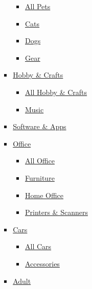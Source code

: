 \begin{itemize}
\begin{itemize}
\begin{itemize}
\begin{itemize}
        \begin{itemize}
        \tightlist
        \item
          \href{/wirecutter/pets/}{All Pets}
        \item
          \href{/wirecutter/pets/cats/}{Cats}
        \item
          \href{/wirecutter/pets/dogs/}{Dogs}
        \item
          \href{/wirecutter/pets/gear-pets/}{Gear}
        \end{itemize}
      \item
        \href{/wirecutter/hobby-crafts/}{Hobby \& Crafts}

        \begin{itemize}
        \tightlist
        \item
          \href{/wirecutter/hobby-crafts/}{All Hobby \& Crafts}
        \item
          \href{/wirecutter/hobby-crafts/music/}{Music}
        \end{itemize}
      \item
        \href{/wirecutter/software/}{Software \& Apps}
      \item
        \href{/wirecutter/office/}{Office}

        \begin{itemize}
        \tightlist
        \item
          \href{/wirecutter/office/}{All Office}
        \item
          \href{/wirecutter/office/furniture-office/}{Furniture}
        \item
          \href{/wirecutter/office/home-office/}{Home Office}
        \item
          \href{/wirecutter/office/printers-scanners/}{Printers \&
          Scanners}
        \end{itemize}
      \item
        \href{/wirecutter/cars/}{Cars}

        \begin{itemize}
        \tightlist
        \item
          \href{/wirecutter/cars/}{All Cars}
        \item
          \href{/wirecutter/cars/accessories-auto/}{Accessories}
        \end{itemize}
      \item
        \href{/wirecutter/adult/}{Adult}
      \end{itemize}
    \end{itemize}
  \end{itemize}
\end{itemize}

